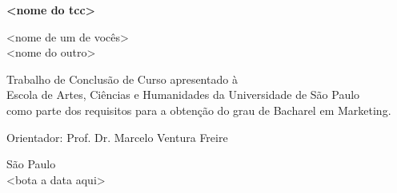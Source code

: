 \newpage
\thispagestyle{empty}

\begin{center}
\textbf{\LARGE{<nome do tcc>}}

\vspace{2cm}

\Large{<nome de um de vocês> \\
<nome do outro>}

\vspace{1cm}

\large{Trabalho de Conclusão de Curso apresentado à \\
Escola de Artes, Ciências e Humanidades da Universidade de São Paulo \\
como parte dos requisitos para a obtenção do grau de Bacharel em Marketing.}

\vspace{1cm}

\large{Orientador: Prof. Dr. Marcelo Ventura Freire}

\vfill

\large{São Paulo \\
<bota a data aqui>}
\end{center}

\newpage
